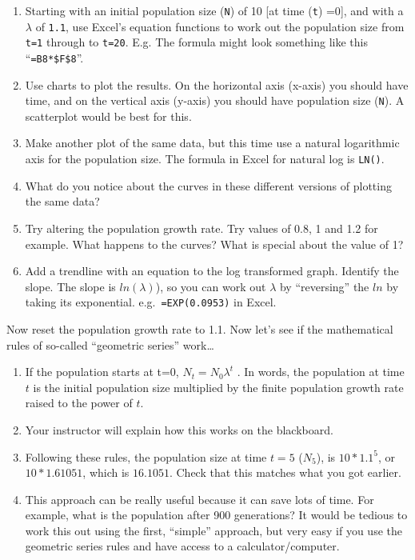\documentclass[
  a4paper]{book}
\providecommand{\tightlist}{%
  \setlength{\itemsep}{0pt}\setlength{\parskip}{0pt}}
\begin{document}
\begin{enumerate}
\def\labelenumi{\arabic{enumi}.}
\tightlist
\item
  Starting with an initial population size (\texttt{N}) of 10 {[}at time (\texttt{t}) =0{]}, and with a \(\lambda\) of \texttt{1.1}, use Excel's equation functions to work out the population size from \texttt{t=1} through to \texttt{t=20}. E.g. The formula might look something like this ``\texttt{=B8*\$F\$8}''.
\item
  Use charts to plot the results. On the horizontal axis (x-axis) you should have time, and on the vertical axis (y-axis) you should have population size (\texttt{N}). A scatterplot would be best for this.
\item
  Make another plot of the same data, but this time use a natural logarithmic axis for the population size. The formula in Excel for natural log is \texttt{LN()}.
\item
  What do you notice about the curves in these different versions of plotting the same data?
\item
  Try altering the population growth rate. Try values of 0.8, 1 and 1.2 for example. What happens to the curves? What is special about the value of 1?
\item
  Add a trendline with an equation to the log transformed graph. Identify the slope. The slope is \(ln(\lambda)\)), so you can work out \(\lambda\) by ``reversing'' the \(ln\) by taking its exponential. e.g.~\texttt{=EXP(0.0953)} in Excel.
\end{enumerate}

Now reset the population growth rate to 1.1. Now let's see if the mathematical rules of so-called ``geometric series'' work\ldots{}

\begin{enumerate}
\def\labelenumi{\arabic{enumi}.}
\tightlist
\item
  If the population starts at t=0, \(N_t = N_0 \lambda^t\) . In words, the population at time \(t\) is the initial population size multiplied by the finite population growth rate raised to the power of \(t\).
\item
  Your instructor will explain how this works on the blackboard.
\item
  Following these rules, the population size at time \(t=5\) (\(N_5\)), is \(10 * 1.1^5\), or \(10* 1.61051\), which is \(16.1051\). Check that this matches what you got earlier.
\item
  This approach can be really useful because it can save lots of time. For example, what is the population after 900 generations? It would be tedious to work this out using the first, ``simple'' approach, but very easy if you use the geometric series rules and have access to a calculator/computer.
\end{enumerate}
\end{document}
